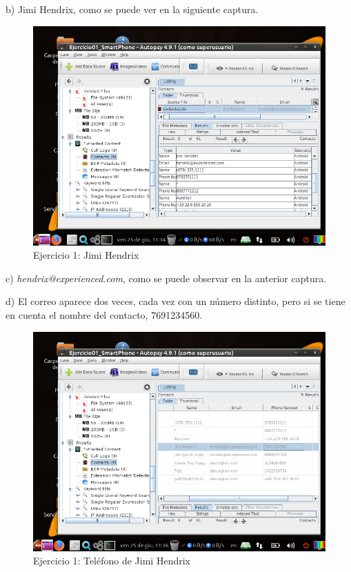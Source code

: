 \documentclass[11pt]{article}
\begin{document}
b) Jimi Hendrix, como se puede ver en la siguiente captura.

\begin{figure}[H]
    \caption{Ejercicio 1: Jimi Hendrix}
    \centering
    \includegraphics[scale=0.7]{e1-7.png}
\end{figure}

c) \textit{hendrix@experienced.com}, como se puede observar en la anterior captura.

d) El correo aparece dos veces, cada vez con un número distinto, pero si se tiene en cuenta el nombre del contacto, 7691234560.

\begin{figure}[H]
    \caption{Ejercicio 1: Teléfono de Jimi Hendrix}
    \centering
    \includegraphics[scale=0.7]{e1-8.png}
\end{figure}
\end{document}
